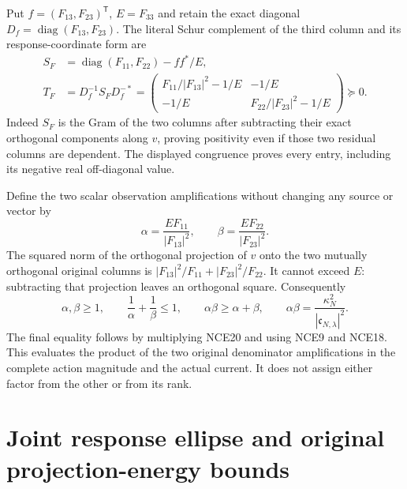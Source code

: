 \documentclass[11pt,a4paper]{article}
\begin{document}
Put $f=(F_{13},F_{23})^{\mathsf T}$, $E=F_{33}$ and retain the exact
diagonal $D_f=\operatorname{diag}(F_{13},F_{23})$. The literal Schur
complement of the third column and its response-coordinate form are
\[
 \begin{split}
 S_F&=\operatorname{diag}(F_{11},F_{22})-ff^*/E,\\
 T_F&=D_f^{-1}S_FD_f^{-*}
  =\begin{pmatrix}
   F_{11}/|F_{13}|^2-1/E&-1/E\\
   -1/E&F_{22}/|F_{23}|^2-1/E
   \end{pmatrix}\succeq0.
 \end{split}                                                     \tag{NCE19}
\]
Indeed $S_F$ is the Gram of the two columns after subtracting their
exact orthogonal components along $v$, proving positivity even if
those two residual columns are dependent. The displayed congruence
proves every entry, including its negative real off-diagonal value.

Define the two scalar observation amplifications without changing any
source or vector by
\[
 \alpha=\frac{E F_{11}}{|F_{13}|^2},\qquad
 \beta=\frac{E F_{22}}{|F_{23}|^2}.
 \tag{NCE20}
\]
The squared norm of the orthogonal projection of $v$ onto the two
mutually orthogonal original columns is
$|F_{13}|^2/F_{11}+|F_{23}|^2/F_{22}$. It cannot exceed $E$:
subtracting that projection leaves an orthogonal square. Consequently
\[
 \alpha,\beta\ge1,\qquad
 \frac1\alpha+\frac1\beta\le1,\qquad
 \alpha\beta\ge\alpha+\beta,
 \qquad
 \boxed{\alpha\beta=
       \frac{\kappa_N^2}{|\mathfrak c_{N,\lambda}|^2}.}
 \tag{NCE21}
\]
The final equality follows by multiplying NCE20 and using NCE9 and
NCE18. This evaluates the product of the two original denominator
amplifications in the complete action magnitude and the actual current.
It does not assign either factor from the other or from its rank.





\endgroup

\clearpage
\begingroup


\setcounter{equation}{0}
\renewcommand{\theequation}{A02JRE.\arabic{equation}}
\section*{Joint response ellipse and original projection-energy bounds}
\end{document}
